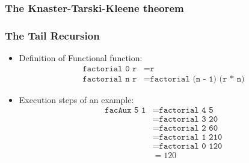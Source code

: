\documentclass{beamer}
\begin{document}
\begin{frame}
	\frametitle{The Knaster-Tarski-Kleene theorem}
	\begin{center}
	\end{center}
\end{frame}

\begin{frame}
	\frametitle{The Tail Recursion}
	\begin{itemize}
		\item Definition of Functional function:
		\begin{align*}
		\texttt{factorial 0 r} &= \texttt{r}\\
		\texttt{factorial n r} &= \texttt{factorial (n - 1) (r * n)}
		\end{align*}
		\item Execution steps of an example:
		\begin{align*}
		\texttt{facAux 5 1} &= \texttt{factorial 4 5}\\
							&= \texttt{factorial 3 20}\\
							&= \texttt{factorial 2 60}\\
							&= \texttt{factorial 1 210}\\
							&= \texttt{factorial 0 120}\\
							&= 120
		\end{align*} 
	\end{itemize}
\end{frame}
\end{document}
